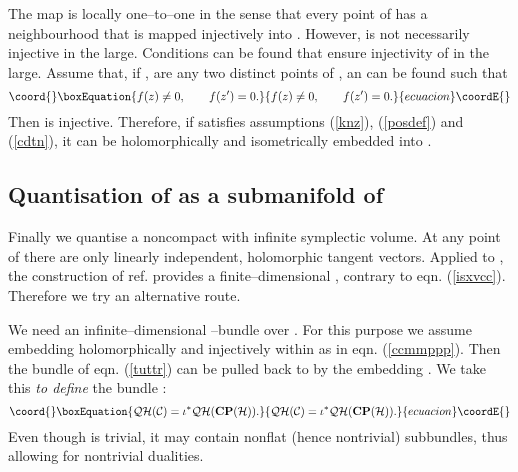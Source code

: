 \documentclass[a4paper,a4paper]{article}
\begin{document}
The map \myHighlight{$\iota$}\coordHE{} is locally one--to--one in the sense that every point of \coordHE{} 
has a neighbourhood that is mapped injectively into \coordHE{}. 
However, \myHighlight{$\iota$}\coordHE{} is not necessarily injective in the large. Conditions can 
be found that ensure injectivity of \myHighlight{$\iota$}\coordHE{} in the large. Assume 
that, if \coordHE{}, \coordHE{} are any two distinct points of \coordHE{}, an 
\coordHE{} can be found such that
\begin{equation}\coord{}\boxEquation{
f(z)\neq 0,\qquad f(z')=0.
\label{cdtn}
}{
f(z)\neq 0,\qquad f(z')=0.
}{ecuacion}\coordE{}\end{equation}
Then \myHighlight{$\iota$}\coordHE{} is injective. Therefore, if \coordHE{} satisfies assumptions (\ref{knz}), 
(\ref{posdef}) and (\ref{cdtn}), it can be holomorphically and isometrically embedded 
into \coordHE{}.


\subsection{Quantisation of \coordHE{} as a submanifold of \coordHE{}}
\label{qqcccepeh}


Finally we quantise a noncompact \coordHE{} with infinite symplectic volume.
At any point of \coordHE{} there are only \coordHE{} linearly independent, holomorphic tangent vectors. 
Applied to \coordHE{}, the construction of ref. \cite{PQM} provides a finite--dimensional 
\coordHE{}, contrary to eqn. (\ref{isxvcc}). Therefore we try an alternative route.

We need an infinite--dimensional \coordHE{}--bundle over \coordHE{}. 
For this purpose we assume embedding \coordHE{} holomorphically 
and injectively within \coordHE{} as in eqn. (\ref{ccmmppp}). 
Then the bundle \coordHE{} of eqn. (\ref{tuttr}) can 
be pulled back to \coordHE{} by the embedding \myHighlight{$\iota$}\coordHE{}. We take this {\it to define}\/
the bundle \coordHE{}:
\begin{equation}\coord{}\boxEquation{
{\cal QH}({\cal C}) = \iota^* {\cal QH}({\bf CP}({\cal H})).
\label{ppbbac}
}{
{\cal QH}({\cal C}) = \iota^* {\cal QH}({\bf CP}({\cal H})).
}{ecuacion}\coordE{}\end{equation}
Even though \coordHE{} is trivial, it may contain nonflat (hence nontrivial) 
subbundles, thus allowing for nontrivial dualities.
\end{document}
